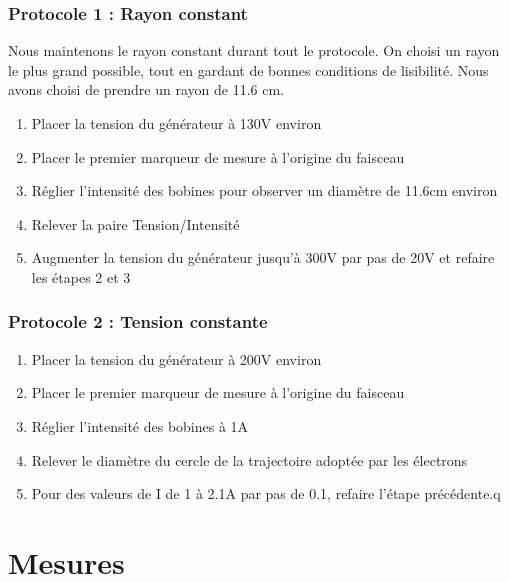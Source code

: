 \documentclass[a4paper,10pt,french]{scrartcl}
\begin{document}
\subsubsection{Protocole 1 : Rayon constant}
Nous maintenons le rayon constant durant tout le protocole. On choisi un rayon le plus grand possible, tout en gardant de bonnes conditions de lisibilité. Nous avons choisi de prendre un rayon de 11.6 cm.
\begin{enumerate}
 \item Placer la tension du générateur à 130V environ
 \item Placer le premier marqueur de mesure à l'origine du faisceau
 \item Réglier l'intensité des bobines pour observer un diamètre de 11.6cm environ
 \item Relever la paire Tension/Intensité
 \item Augmenter la tension du générateur jusqu'à 300V par pas de 20V et refaire les étapes 2 et 3
\end{enumerate}
\subsubsection{Protocole 2 : Tension constante}
\begin{enumerate}
 \item Placer la tension du générateur à 200V environ
  \item Placer le premier marqueur de mesure à l'origine du faisceau
 \item Réglier l'intensité des bobines à 1A
 \item Relever le diamètre du cercle de la trajectoire adoptée par les électrons
 \item Pour des valeurs de I de 1 à 2.1A par pas de 0.1, refaire l'étape précédente.q
\end{enumerate}
\section{Mesures}
\end{document}
